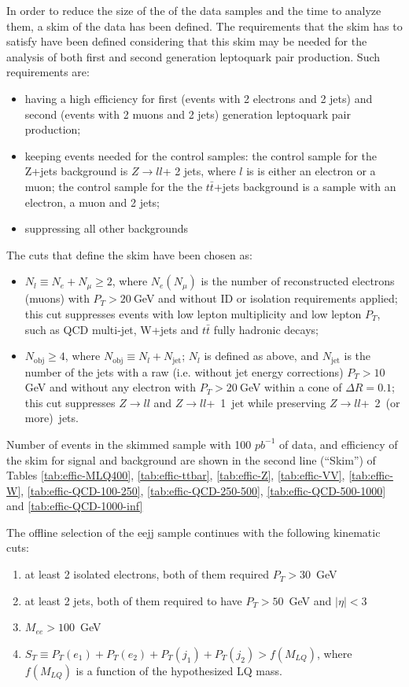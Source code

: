 In order to reduce the size of the of the data samples and the time to analyze them, a skim of the 
data has been defined.
The requirements that the skim has to satisfy have been defined considering that this skim may be needed
for the analysis of both first and second generation leptoquark pair production. Such requirements are:
\begin{itemize}
\item having a high efficiency for first (events with 2 electrons and 2 jets) and second (events with 
2 muons and 2 jets) generation leptoquark pair production; 
\item keeping events needed for the control samples: the control sample for the Z+jets background is $Z\rightarrow l l$+ 2 jets,
where $l$ is is either an electron or a muon; the control sample for the the $t\bar{t}$+jets background is a sample 
with an electron, a muon and 2 jets;
\item suppressing all other backgrounds
\end{itemize}
The cuts that define the skim have been chosen as:
\begin{itemize}
\item $N_l \equiv N_e + N_{\mu} \ge 2$, where $N_e (N_{\mu})$ is the number of reconstructed electrons (muons)
with $P_T>20~$GeV and without ID or isolation requirements applied; this cut suppresses events with low 
lepton multiplicity and low lepton $P_T$, such as QCD multi-jet, W+jets and $t\bar{t}$ fully hadronic decays;
\item $N_{\mathrm{obj}} \ge 4$, where $N_{\mathrm{obj}} \equiv N_l + N_{\mathrm{jet}}$; $N_l$ is defined as above, and
$N_{\mathrm{jet}}$ is the number of the jets with a raw (i.e. without jet energy corrections) $P_T > 10~$GeV and without 
any electron with $P_T > 20~$GeV within a cone of $\Delta R=0.1$; this cut suppresses $Z \rightarrow ll$ and 
$Z \rightarrow ll$+~1~jet while preserving $Z \rightarrow ll$+~2~(or more)~jets.
\end{itemize}

Number of events in the skimmed sample with 100 $pb^{-1}$ of data, and 
efficiency of the skim for signal and background are shown in the second line (``Skim'') 
of Tables
\ref{tab:effic-MLQ400}, 
\ref{tab:effic-ttbar}, 
\ref{tab:effic-Z}, 
\ref{tab:effic-VV},
\ref{tab:effic-W},
\ref{tab:effic-QCD-100-250},
\ref{tab:effic-QCD-250-500},
\ref{tab:effic-QCD-500-1000} and
\ref{tab:effic-QCD-1000-inf}

The offline selection of the eejj sample continues with the following kinematic cuts:
%
\begin{enumerate}
\item at least 2 isolated electrons, both of them required $P_T>30$~GeV 
\item at least 2 jets, both of them required to have $P_T>50$~GeV and $|\eta|<3$
\item $M_{ee}>100$~GeV
\item $S_T\equiv P_T(e_1)+P_T(e_2)+P_T(j_1)+P_T(j_2)>f(M_{LQ})$, where $f(M_{LQ})$ is a function 
of the hypothesized LQ mass.
\end{enumerate}
%

